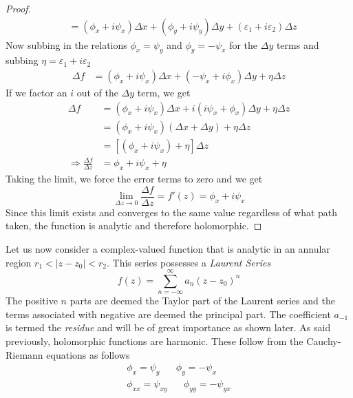 \documentclass{report}
\theoremstyle{definition}
\theoremstyle{remark}
\newcommand{\twen}{\hspace{20pt}}
\begin{document}
\begin{proof}
\begin{equation*}
\begin{split}
            &= (\phi_x+i\psi_x)\Delta x+ (\phi_y+i\psi_y)\Delta y +(\varepsilon_1+i\varepsilon_2)\Delta z
        \end{split}
    \end{equation*}
    Now subbing in the relations $\phi_x=\psi_y$ and $\phi_y = -\psi_x$ for the $\Delta y$ terms and subbing $\eta = \varepsilon_1+i\varepsilon_2$
    \begin{equation*}
        \begin{split}
            \Delta f &= (\phi_x + i\psi_x)\Delta x+(-\psi_x+i\phi_x)\Delta y+\eta \Delta z
        \end{split}
    \end{equation*}
    If we factor an $i$ out of the $\Delta y$ term, we get 
    \begin{equation*}
        \begin{split}
            \Delta f &= (\phi_x+i\psi_x)\Delta x+i(i\psi_x+\phi_x)\Delta y+\eta \Delta z \\
            &= (\phi_x+i\psi_x)(\Delta x+\Delta y) + \eta\Delta z \\
            &=[(\phi_x+i\psi_x)+\eta] \Delta z \\
            \Rightarrow\frac{\Delta f}{\Delta z} &=\phi_x+i\psi_x + \eta
        \end{split}
    \end{equation*}
    Taking the limit, we force the error terms to zero and we get 
    \begin{equation*}
        \lim_{\Delta z\rightarrow 0} \frac{\Delta f}{\Delta z} =f'(z) =\phi_x+i\psi_x
    \end{equation*}
    Since this limit exists and converges to the same value regardless of what path taken, the function is analytic and therefore holomorphic.
\end{proof}
Let us now consider a complex-valued function that is analytic in an annular region $r_1< |z-z_0|<r_2$. This series possesses a \textit{Laurent Series} 
\begin{equation*}
    f(z) = \sum^\infty_{n=-\infty}a_n(z-z_0)^n
\end{equation*}
The positive $n$ parts are deemed the Taylor part of the Laurent series and the terms associated with negative are deemed the principal part. The coefficient $a_{-1}$ is termed the \textit{residue} and will be of great importance as shown later. 
As said previously, holomorphic functions are harmonic. These follow from the Cauchy-Riemann equations as follows 
\begin{equation*}
    \begin{split}
        \phi_x=\psi_y \twen \phi_y=-\psi_x \\
        \phi_{xx}=\psi_{xy} \twen \phi_{yy} =-\psi_{yx}
    \end{split}
\end{equation*}
\end{document}
